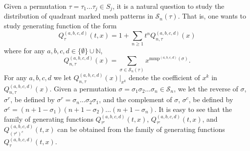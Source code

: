 \documentclass[
final,nomarks
]{dmtcs-episciences}
\newcommand{\Sn}[1]{\mathcal{S}_{#1}}
\newcommand{\mmp}{\mathrm{mmp}}
\begin{document}
Given a permutation \begin{math}\tau = \tau_1 \ldots \tau_j \in S_j\end{math}, it is a natural question to study the 
distribution of quadrant marked mesh patterns in \begin{math}\Sn{n}(\tau)\end{math}. That is, one wants to 
study generating function of the form 
\begin{equation} \label{Rabcd}
Q_{\tau}^{(a,b,c,d)}(t,x) = 1 + \sum_{n\geq 1} t^n  Q_{n,\tau}^{(a,b,c,d)}(x)
\end{equation}
where for  any \begin{math}a,b,c,d \in \{\emptyset\} \cup \mathbb{N}\end{math}, 
\begin{equation} \label{Rabcdn}
Q_{n,\tau}^{(a,b,c,d)}(x) = \sum_{\sigma \in \Sn{n}(\tau)} x^{\mmp^{(a,b,c,d)}(\sigma)}.
\end{equation}
For any \begin{math}a,b,c,d\end{math} we let \begin{math}Q_{n,\tau}^{(a,b,c,d)}(x)|_{x^k}\end{math} denote 
the coefficient of \begin{math}x^k\end{math} in \begin{math}Q_{n,\tau}^{(a,b,c,d)}(x)\end{math}. 
Given a permutation \begin{math}\sigma = \sigma_1 \sigma_2 \ldots \sigma_n \in \Sn{n}\end{math}, we let the reverse of 
\begin{math}\sigma\end{math}, \begin{math}\sigma^r\end{math}, be defined by \begin{math}\sigma^r = \sigma_n \ldots \sigma_2 \sigma_1\end{math}, and the 
complement of \begin{math}\sigma\end{math}, \begin{math}\sigma^c\end{math}, be defined by \begin{math}\sigma^c = (n+1 -\sigma_1) (n+1-\sigma_2) \ldots  
(n+1 -\sigma_n)\end{math}.  It is easy to see that the family of generating 
functions \begin{math}Q_{\tau^r}^{(a,b,c,d)}(t,x)\end{math}, \begin{math}Q_{\tau^c}^{(a,b,c,d)}(t,x)\end{math}, and 
\begin{math}Q_{(\tau^r)^c}^{(a,b,c,d)}(t,x)\end{math} can be obtained from the family of generating 
functions \begin{math}Q_{\tau}^{(a,b,c,d)}(t,x)\end{math}. 
\end{document}
